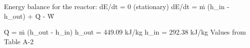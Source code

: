 Energy balance for the reactor:  
dE/dt = 0 (stationary)  
dE/dt = ṁ (h_in - h_out) + Q̇ - Ẇ  

Q̇ = ṁ (h_out - h_in)  
h_out = 449.09 kJ/kg  
h_in = 292.38 kJ/kg  
Values from Table A-2
